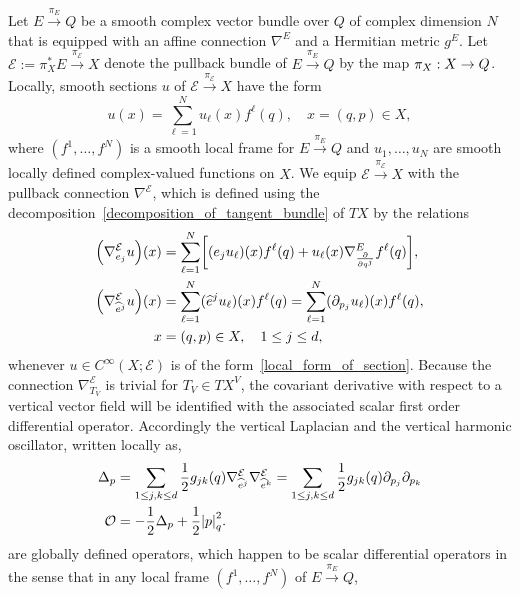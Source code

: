 \documentclass[10pt]{amsart}
\theoremstyle{definition}\newtheorem{defi}[theo]{Definition}\newtheorem{rema}[theo]{Remark}\newtheorem{exam}[theo]{Example}\newtheorem{exem}[theo]{Example}\newtheorem{nota}[theo]{Notation}
\newcommand{\clO}{\mathcal{O}}
\newcommand{\clE}{\mathcal{E}}
\newcommand{\p}{\partial}
\newcommand{\abs}[1]{\left| #1 \right|}
\let\originalleft\left
\let\originalright\right
\renewcommand{\left}{\mathopen{}\mathclose\bgroup\originalleft}
\renewcommand{\right}{\aftergroup\egroup\originalright}
\renewcommand*{\to}{\mathchoice{\longrightarrow}{\rightarrow}{\rightarrow}{\rightarrow}}
\begin{document}
Let $E \xrightarrow{\pi_E} Q$ be a smooth complex vector bundle over $Q$ of complex dimension $N$ that is equipped with an affine connection $\nabla^E$ and a Hermitian metric $g^E$. Let $\clE := \pi_X^* E \xrightarrow{\pi_{\clE}} X$ denote the pullback bundle of $E \xrightarrow{\pi_E} Q$ by the map $\pi_X: X \to Q$. Locally, smooth sections $u$ of $\clE \xrightarrow{\pi_{\clE}} X$ have the form
\begin{equation}\label{local_form_of_section}
u(x) = \sum_{\ell = 1}^{N} u_\ell(x) f^\ell(q), \quad x = (q,p) \in X,
\end{equation}
where $(f^1, \dots, f^{N})$ is a smooth local frame for $E \xrightarrow{\pi_E} Q$ and $u_1, \dots, u_N$ are smooth locally defined complex-valued functions on $X$. We equip $\clE \xrightarrow{\pi_\clE} X$ with the pullback connection $\nabla^{\clE}$, which is defined using the decomposition~\eqref{decomposition_of_tangent_bundle} of $TX$ by the relations
\begin{equation}
\begin{aligned}
\left(\nabla^{\clE}_{e_j} u \right)(x) &= \sum_{\ell=1}^{N} \left[(e_j u_\ell)(x) f^\ell(q) + u_\ell(x) \nabla^E_{\frac{\p}{\p q^j}} f^\ell(q)\right], \\
\left(\nabla^{\clE}_{\widehat{e}^j} u \right)(x) &= \sum_{\ell=1}^{N} (\widehat{e}^j u_\ell)(x) f^\ell(q)=\sum_{\ell=1}^{N}(\partial_{p_{j}}u_{\ell})(x)f^{\ell}(q) , \\
x &= (q,p) \in X, \quad 1 \le j \le d,
\end{aligned}
\end{equation}
whenever $u \in C^\infty(X; \clE)$ is of the form~\eqref{local_form_of_section}. Because the connection $\nabla^{\clE}_{T_{V}}$ is trivial for $T_{V}\in TX^{V}$, the covariant derivative with respect to a vertical vector field will be identified with the associated scalar first order differential operator. Accordingly the vertical Laplacian and the vertical harmonic oscillator, written locally as,
\begin{align}
\Delta_p &= \sum_{1 \le j, k \le d} \frac{1}{2} g_{jk}(q) \nabla^{\clE}_{\widehat{e}^j} \nabla^{\clE}_{\widehat{e}^k}=\sum_{1\leq j,k\le d} \frac{1}{2} g_{jk}(q) \partial_{p_{j}}\partial_{p_{k}}
\label{vertical_laplacian}
\\
\clO &= -\frac{1}{2} \Delta_p + \frac{1}{2} \abs{p}_{q}^2.\label{scalar_vertical_harmonic_oscillator}
\end{align}
are globally defined operators, which happen to be scalar differential operators in the sense that in any local frame $(f^{1},\dots,f^{N})$ of $E\xrightarrow{\pi_{E}} Q$,
\end{document}
